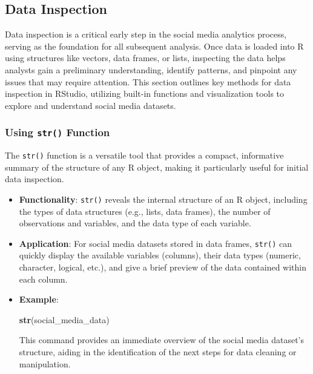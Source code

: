 \documentclass[
]{book}
\newenvironment{Shaded}{\begin{snugshade}}{\end{snugshade}}
\newcommand{\FunctionTok}[1]{\textcolor[rgb]{0.13,0.29,0.53}{\textbf{#1}}}
\newcommand{\NormalTok}[1]{#1}
\begin{document}
\hypertarget{data-inspection}{%
\subsection{Data Inspection}\label{data-inspection}}

Data inspection is a critical early step in the social media analytics process, serving as the foundation for all subsequent analysis. Once data is loaded into R using structures like vectors, data frames, or lists, inspecting the data helps analysts gain a preliminary understanding, identify patterns, and pinpoint any issues that may require attention. This section outlines key methods for data inspection in RStudio, utilizing built-in functions and visualization tools to explore and understand social media datasets.

\hypertarget{using-str-function}{%
\subsubsection{\texorpdfstring{Using \texttt{str()} Function}{Using str() Function}}\label{using-str-function}}

The \texttt{str()} function is a versatile tool that provides a compact, informative summary of the structure of any R object, making it particularly useful for initial data inspection.

\begin{itemize}
\item
  \textbf{Functionality}: \texttt{str()} reveals the internal structure of an R object, including the types of data structures (e.g., lists, data frames), the number of observations and variables, and the data type of each variable.
\item
  \textbf{Application}: For social media datasets stored in data frames, \texttt{str()} can quickly display the available variables (columns), their data types (numeric, character, logical, etc.), and give a brief preview of the data contained within each column.
\item
  \textbf{Example}:

\begin{Shaded}
\begin{Highlighting}[]
\FunctionTok{str}\NormalTok{(social\_media\_data)}
\end{Highlighting}
\end{Shaded}

  This command provides an immediate overview of the social media dataset's structure, aiding in the identification of the next steps for data cleaning or manipulation.
\end{itemize}
\end{document}
